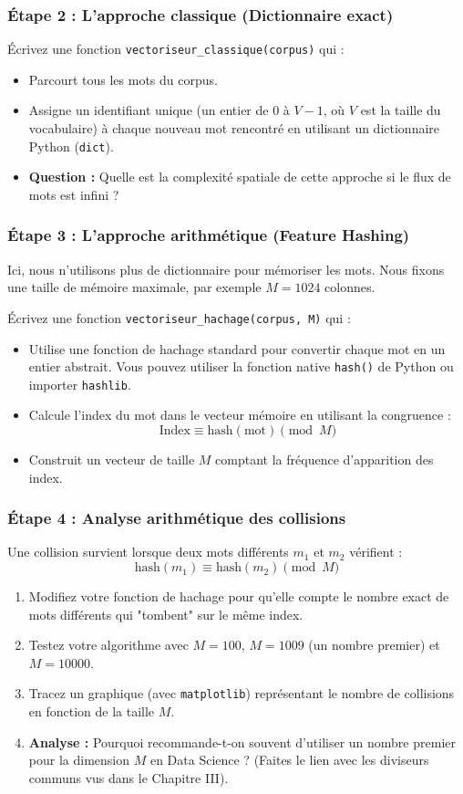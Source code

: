 \subsubsection*{Étape 2 : L'approche classique (Dictionnaire exact)}
Écrivez une fonction \texttt{vectoriseur\_classique(corpus)} qui :
\begin{itemize}
    \item Parcourt tous les mots du corpus.
    \item Assigne un identifiant unique (un entier de $0$ à $V-1$, où $V$ est la taille du vocabulaire) à chaque nouveau mot rencontré en utilisant un dictionnaire Python (\texttt{dict}).
    \item \textbf{Question :} Quelle est la complexité spatiale de cette approche si le flux de mots est infini ?
\end{itemize}

\subsubsection*{Étape 3 : L'approche arithmétique (Feature Hashing)}
Ici, nous n'utilisons plus de dictionnaire pour mémoriser les mots. Nous fixons une taille de mémoire maximale, par exemple $M = 1024$ colonnes.

Écrivez une fonction \texttt{vectoriseur\_hachage(corpus, M)} qui :
\begin{itemize}
    \item Utilise une fonction de hachage standard pour convertir chaque mot en un entier abstrait. Vous pouvez utiliser la fonction native \texttt{hash()} de Python ou importer \texttt{hashlib}.
    \item Calcule l'index du mot dans le vecteur mémoire en utilisant la congruence : 
    $$ \text{Index} \equiv \text{hash}(\text{mot}) \pmod M $$
    \item Construit un vecteur de taille $M$ comptant la fréquence d'apparition des index.
\end{itemize}

\subsubsection*{Étape 4 : Analyse arithmétique des collisions}
Une collision survient lorsque deux mots différents $m_1$ et $m_2$ vérifient :
$$ \text{hash}(m_1) \equiv \text{hash}(m_2) \pmod M $$
\begin{enumerate}
    \item Modifiez votre fonction de hachage pour qu'elle compte le nombre exact de mots différents qui "tombent" sur le même index.
    \item Testez votre algorithme avec $M = 100$, $M = 1009$ (un nombre premier) et $M = 10000$.
    \item Tracez un graphique (avec \texttt{matplotlib}) représentant le nombre de collisions en fonction de la taille $M$. 
    \item \textbf{Analyse :} Pourquoi recommande-t-on souvent d'utiliser un nombre premier pour la dimension $M$ en Data Science ? (Faites le lien avec les diviseurs communs vus dans le Chapitre III).
\end{enumerate}

